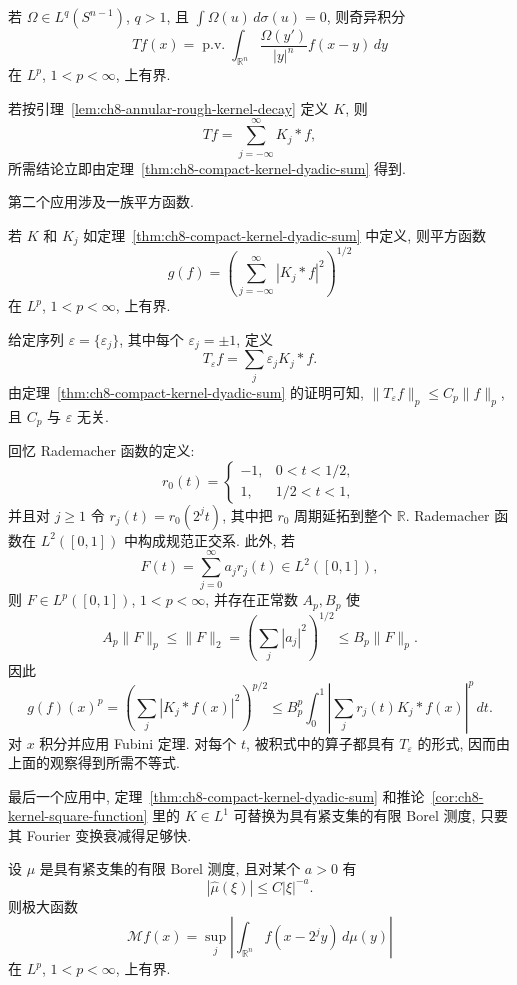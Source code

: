 \begin{Corollary}
\label{cor:ch8-rough-singular-integral}
若 $\Omega\in L^q(S^{n-1})$, $q>1$, 且 $\int\Omega(u)\,d\sigma(u)=0$, 则奇异积分
\[
 Tf(x)=\operatorname{p.v.}\int_{\mathbb R^n}
 \frac{\Omega(y')}{|y|^n}f(x-y)\,dy
\]
在 $L^p$, $1<p<\infty$, 上有界.
\end{Corollary}

若按引理~\ref{lem:ch8-annular-rough-kernel-decay} 定义 $K$, 则
\[
 Tf=\sum_{j=-\infty}^{\infty}K_j*f,
\]
所需结论立即由定理~\ref{thm:ch8-compact-kernel-dyadic-sum} 得到.

第二个应用涉及一族平方函数.

\begin{Corollary}
\label{cor:ch8-kernel-square-function}
若 $K$ 和 $K_j$ 如定理~\ref{thm:ch8-compact-kernel-dyadic-sum} 中定义, 则平方函数
\[
 g(f)=\left(\sum_{j=-\infty}^{\infty}|K_j*f|^2\right)^{1/2}
\]
在 $L^p$, $1<p<\infty$, 上有界.
\end{Corollary}

\hypertarget{chapter-08-page-189}{}
\begin{Proof}
给定序列 $\varepsilon=\{\varepsilon_j\}$, 其中每个 $\varepsilon_j=\pm1$, 定义
\[
 T_\varepsilon f=\sum_j\varepsilon_jK_j*f.
\]
由定理~\ref{thm:ch8-compact-kernel-dyadic-sum} 的证明可知, $\|T_\varepsilon f\|_p\le C_p\|f\|_p$, 且 $C_p$ 与 $\varepsilon$ 无关.

回忆 Rademacher 函数的定义:
\[
 r_0(t)=
 \begin{cases}
 -1,&0<t<1/2,\\
 1,&1/2<t<1,
 \end{cases}
\]
并且对 $j\ge1$ 令 $r_j(t)=r_0(2^jt)$, 其中把 $r_0$ 周期延拓到整个 $\mathbb R$. Rademacher 函数在 $L^2([0,1])$ 中构成规范正交系. 此外, 若
\[
 F(t)=\sum_{j=0}^{\infty}a_jr_j(t)\in L^2([0,1]),
\]
则 $F\in L^p([0,1])$, $1<p<\infty$, 并存在正常数 $A_p,B_p$ 使
\[
 A_p\|F\|_p\le\|F\|_2
 =\left(\sum_j|a_j|^2\right)^{1/2}
 \le B_p\|F\|_p.
\]
因此
\[
 g(f)(x)^p
 =\left(\sum_j|K_j*f(x)|^2\right)^{p/2}
 \le B_p^p\int_0^1\left|\sum_jr_j(t)K_j*f(x)\right|^p\,dt.
\]
对 $x$ 积分并应用 Fubini 定理. 对每个 $t$, 被积式中的算子都具有 $T_\varepsilon$ 的形式, 因而由上面的观察得到所需不等式.
\end{Proof}

最后一个应用中, 定理~\ref{thm:ch8-compact-kernel-dyadic-sum} 和推论~\ref{cor:ch8-kernel-square-function} 里的 $K\in L^1$ 可替换为具有紧支集的有限 Borel 测度, 只要其 Fourier 变换衰减得足够快.

\begin{Corollary}
\label{cor:ch8-decaying-measure-maximal}
设 $\mu$ 是具有紧支集的有限 Borel 测度, 且对某个 $a>0$ 有
\[
 |\widehat\mu(\xi)|\le C|\xi|^{-a}.
\]
则极大函数
\[
 \mathcal Mf(x)=\sup_j\left|\int_{\mathbb R^n}f(x-2^jy)\,d\mu(y)\right|
\]
在 $L^p$, $1<p<\infty$, 上有界.
\end{Corollary}

